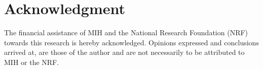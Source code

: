 \documentclass[10pt,a4paper,conference]{IEEEtran}
\begin{document}
  \section*{Acknowledgment}
\fi

The financial assistance of MIH and the National Research Foundation (NRF) towards this research is hereby acknowledged. Opinions expressed and
conclusions arrived at, are those of the author and are not necessarily to be attributed to MIH or the NRF.




\end{document}
